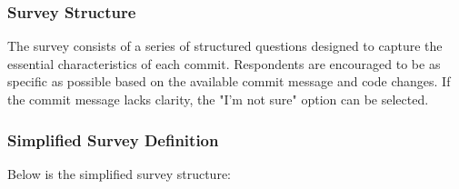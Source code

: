 \subsubsection{Survey Structure}

The survey consists of a series of structured questions designed to capture the essential characteristics of each commit. Respondents are encouraged to be as specific as possible based on the available commit message and code changes. If the commit message lacks clarity, the "I'm not sure" option can be selected.

\subsubsection{Simplified Survey Definition}

Below is the simplified survey structure:

